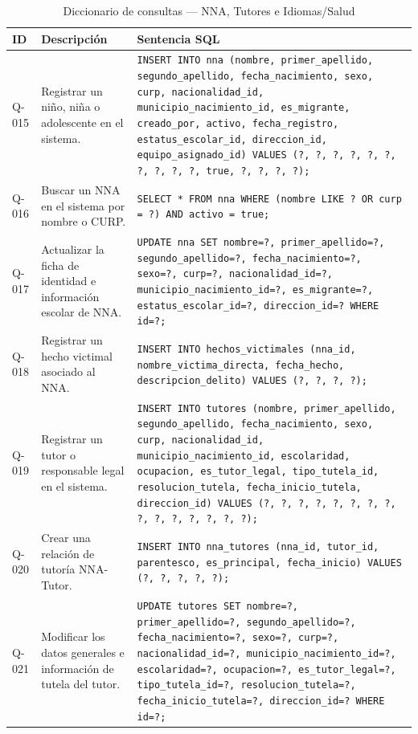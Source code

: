\begin{table}[H]
	\centering
	\caption{Diccionario de consultas --- NNA, Tutores e Idiomas/Salud}
	\label{tab:consultas-nna-tutores}
	\footnotesize
	\begin{tabular}{l p{4.5cm} p{8.5cm}}
		\toprule
		\textbf{ID} & \textbf{Descripción} & \textbf{Sentencia SQL} \\
		\midrule
		Q-015 & Registrar un niño, niña o adolescente en el sistema. & 
		\texttt{INSERT INTO nna (nombre, primer\_apellido, segundo\_apellido, fecha\_nacimiento, sexo, curp, nacionalidad\_id, municipio\_nacimiento\_id, es\_migrante, creado\_por, activo, fecha\_registro, estatus\_escolar\_id, direccion\_id, equipo\_asignado\_id) VALUES (?, ?, ?, ?, ?, ?, ?, ?, ?, ?, true, ?, ?, ?, ?);} \\
		\addlinespace
		Q-016 & Buscar un NNA en el sistema por nombre o CURP. & 
		\texttt{SELECT * FROM nna WHERE (nombre LIKE ? OR curp = ?) AND activo = true;} \\
		\addlinespace
		Q-017 & Actualizar la ficha de identidad e información escolar de NNA. & 
		\texttt{UPDATE nna SET nombre=?, primer\_apellido=?, segundo\_apellido=?, fecha\_nacimiento=?, sexo=?, curp=?, nacionalidad\_id=?, municipio\_nacimiento\_id=?, es\_migrante=?, estatus\_escolar\_id=?, direccion\_id=? WHERE id=?;} \\
		\addlinespace
		Q-018 & Registrar un hecho victimal asociado al NNA. & 
		\texttt{INSERT INTO hechos\_victimales (nna\_id, nombre\_victima\_directa, fecha\_hecho, descripcion\_delito) VALUES (?, ?, ?, ?);} \\
		\addlinespace
		Q-019 & Registrar un tutor o responsable legal en el sistema. & 
		\texttt{INSERT INTO tutores (nombre, primer\_apellido, segundo\_apellido, fecha\_nacimiento, sexo, curp, nacionalidad\_id, municipio\_nacimiento\_id, escolaridad, ocupacion, es\_tutor\_legal, tipo\_tutela\_id, resolucion\_tutela, fecha\_inicio\_tutela, direccion\_id) VALUES (?, ?, ?, ?, ?, ?, ?, ?, ?, ?, ?, ?, ?, ?, ?);} \\
		\addlinespace
		Q-020 & Crear una relación de tutoría NNA-Tutor. & 
		\texttt{INSERT INTO nna\_tutores (nna\_id, tutor\_id, parentesco, es\_principal, fecha\_inicio) VALUES (?, ?, ?, ?, ?);} \\
		\addlinespace
		Q-021 & Modificar los datos generales e información de tutela del tutor. & 
		\texttt{UPDATE tutores SET nombre=?, primer\_apellido=?, segundo\_apellido=?, fecha\_nacimiento=?, sexo=?, curp=?, nacionalidad\_id=?, municipio\_nacimiento\_id=?, escolaridad=?, ocupacion=?, es\_tutor\_legal=?, tipo\_tutela\_id=?, resolucion\_tutela=?, fecha\_inicio\_tutela=?, direccion\_id=? WHERE id=?;} \\

\end{tabular}
\end{table}
